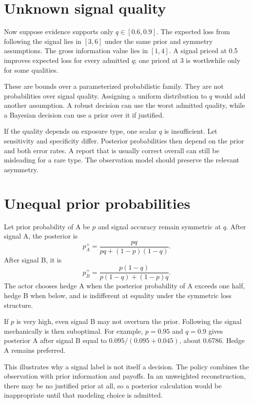 \section{Unknown signal quality}
Now suppose evidence supports only $q\in[0.6,0.9]$. The expected loss from following the signal lies in $[3,6]$ under the same prior and symmetry assumptions. The gross information value lies in $[1,4]$. A signal priced at 0.5 improves expected loss for every admitted $q$; one priced at 3 is worthwhile only for some qualities.

These are bounds over a parameterized probabilistic family. They are not probabilities over signal quality. Assigning a uniform distribution to $q$ would add another assumption. A robust decision can use the worst admitted quality, while a Bayesian decision can use a prior over it if justified.

If the quality depends on exposure type, one scalar $q$ is insufficient. Let sensitivity and specificity differ. Posterior probabilities then depend on the prior and both error rates. A report that is usually correct overall can still be misleading for a rare type. The observation model should preserve the relevant asymmetry.

\section{Unequal prior probabilities}
Let prior probability of A be $p$ and signal accuracy remain symmetric at $q$. After signal A, the posterior is
\begin{equation}
 p_A^+=\frac{pq}{pq+(1-p)(1-q)}.
\end{equation}
After signal B, it is
\begin{equation}
 p_B^+=\frac{p(1-q)}{p(1-q)+(1-p)q}.
\end{equation}
The actor chooses hedge A when the posterior probability of A exceeds one half, hedge B when below, and is indifferent at equality under the symmetric loss structure.

If $p$ is very high, even signal B may not overturn the prior. Following the signal mechanically is then suboptimal. For example, $p=0.95$ and $q=0.9$ gives posterior A after signal B equal to $0.095/(0.095+0.045)$, about 0.6786. Hedge A remains preferred.

This illustrates why a signal label is not itself a decision. The policy combines the observation with prior information and payoffs. In an unweighted reconstruction, there may be no justified prior at all, so a posterior calculation would be inappropriate until that modeling choice is admitted.

